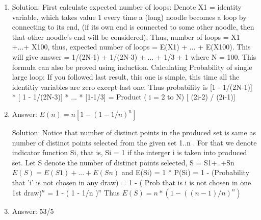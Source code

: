 \begin{enumerate}

\item
Solution: First calculate expected number of loops:
Denote X1 = identity variable, which takes value 1 every time a (long) noodle becomes a loop by connecting to its end, (if its own end is connected to some other noodle, then that other noodle's end will be considered). Thus, number of loops = X1 +...+ X100, thus, expected number of loops = E(X1) + ... + E(X100). This will give answer = 1/(2N-1) + 1/(2N-3) + ... + 1/3 + 1
where N = 100. This formula can also be proved using induction.
Calculating Probability of single large loop:
If you followed last result, this one is simple, this time all the identitiy variables are zero except last one. Thus probability is [1 - 1/(2N-1)] * [ 1 - 1/(2N-3)] * ... * [1-1/3]
= Product ( i = 2 to N) [ (2i-2) / (2i-1)]




\item
Answer: $E(n) = n[1-(1-1/n)^n]$
 
Solution: Notice that number of distinct points in the produced set is same as number of distinct points selected from the given set {1..n} . For that we denote indicator function Si, that is, Si = 1 if the interger i is taken into produced set.
Let S denote the number of distinct points selected, S = S1+..+Sn
$E(S) = E(S1) +...+ E(Sn)$
and E(Si) = 1 * P(Si) = 1 - (Probability that 'i' is not chosen in any draw)
= 1 - ( Prob that is i is not chosen in one 1st draw)$^n$ = 1 - (  1 - 1/n )$^n$
Thus $E(S) = n * ( 1 - ( (n-1) / n)^n )$




\item
Answer: 53/5
 

\end{enumerate}
